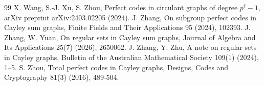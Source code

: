 \documentclass[12pt]{article}
\begin{document}
\begin{thebibliography}{99}
 X. Wang, S.-J. Xu, S. Zhou, Perfect codes in circulant graphs of degree $p^\ell-1$, arXiv preprint arXiv:2403.02205 (2024).
 J. Zhang, On subgroup perfect codes in Cayley sum graphs, Finite Fields and Their Applications 95 (2024), 102393.
 J. Zhang, W. Yuan, On regular sets in Cayley sum graphs, Journal of Algebra and Its Applications 25(7) (2026), 2650062.
 J. Zhang, Y. Zhu, A note on regular sets in Cayley graphs, Bulletin of the Australian Mathematical Society 109(1) (2024), 1--5.
 S. Zhou, Total perfect codes in Cayley graphs, Designs, Codes and Cryptography 81(3) (2016), 489-504.

\end{thebibliography}
\end{document}
